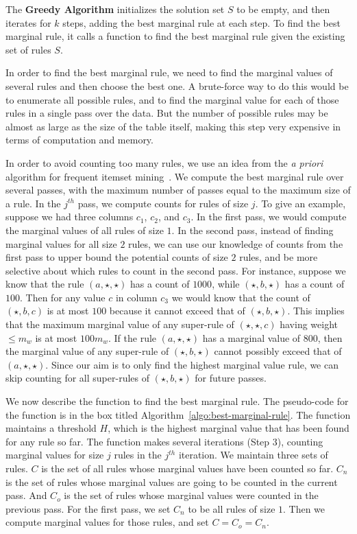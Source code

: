 \documentclass{sig-alternate}
\begin{document}
The \textbf{Greedy Algorithm} initializes the solution set $S$ to be empty, and then iterates for $k$ steps, adding the best marginal rule at each step. To find the best marginal rule, it calls a function to find the best marginal rule given the existing set of rules $S$. 

In order to find the best marginal rule, we need to find the marginal values of several rules and then choose the best one. A brute-force way to do this would be to enumerate all possible rules, and to find the marginal value for each of those rules in a single pass over the data. But the number of possible rules may be almost as large as the size of the table itself, making this step very expensive in terms of computation and memory. 

In order to avoid counting too many rules, we use an idea from the {\em a priori} algorithm for frequent itemset mining~\cite{apriori}. We compute the best marginal rule over several passes, with the maximum number of passes equal to the maximum size of a rule. In the $j^{th}$ pass, we compute counts for rules of size $j$. To give an example, suppose we had three columns $c_1$, $c_2$, and $c_3$. In the first pass, we would compute the marginal values of all rules of size $1$. In the second pass, instead of finding marginal values for all size $2$ rules, we can use our knowledge of counts from the first pass to upper bound the potential counts of size $2$ rules, and be more selective about which rules to count in the second pass. For instance, suppose we know that the rule $(a, \star, \star)$ has a count of $1000$, while $(\star, b, \star)$ has a count of $100$. Then for any value $c$ in column $c_3$ we would know that the count of $(\star, b, c)$ is at most $100$ because it cannot exceed that of $(\star, b, \star)$. This implies that the maximum marginal value of any super-rule of $(\star, \star, c)$ having weight $\leq m_w$ is at most $100m_w$. If the rule $(a, \star, \star)$ has a marginal value of $800$, then the marginal value of any super-rule of $(\star, b, \star)$ cannot possibly exceed that of $(a, \star, \star)$. Since our aim is to only find the highest marginal value rule, we can skip counting for all super-rules of $(\star, b, \star)$ for future passes.

We now describe the function to find the best marginal rule. The pseudo-code for the function is in the box titled Algorithm~\ref{algo:best-marginal-rule}. The function maintains a threshold $H$, which is the highest marginal value that has been found for any rule so far. The function makes several iterations (Step $3$), counting marginal values for size $j$ rules in the $j^{th}$ iteration. We maintain three sets of rules. $C$ is the set of all rules whose marginal values have been counted so far. $C_n$ is the set of rules whose marginal values are going to be counted in the current pass. And $C_o$ is the set of rules whose marginal values were counted in the previous pass. For the first pass, we set $C_n$ to be all rules of size $1$. Then we compute marginal values for those rules, and set $C = C_o = C_n$.
\end{document}
